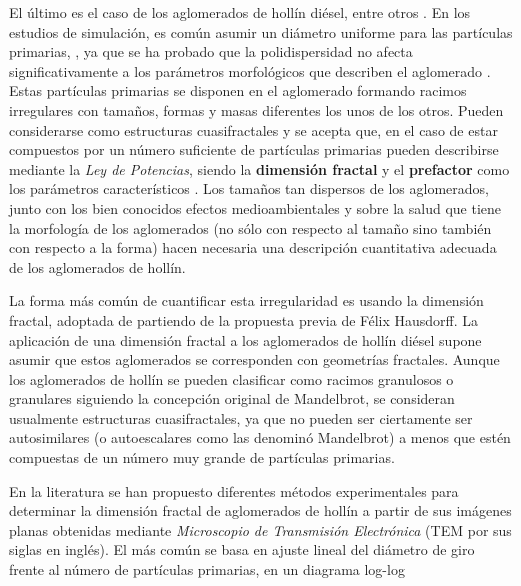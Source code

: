\par El último es el caso de los aglomerados de hollín diésel, entre otros \cite{lapuertaetal:2007}. En los estudios de simulación, es común asumir un diámetro uniforme para las partículas primarias, \cite{wuetal:1993,tandonetal:1995,ohetal:1997,leeetal:2002,zhuetal:2003}, ya que se ha probado que la polidispersidad no afecta significativamente a los parámetros morfológicos que describen el aglomerado \cite{busheletal:1998}. Estas partículas primarias se disponen en el aglomerado formando racimos irregulares con tamaños, formas y masas diferentes los unos de los otros. Pueden considerarse como estructuras cuasifractales y se acepta que, en el caso de estar compuestos por un número suficiente de partículas primarias pueden describirse mediante la \emph{Ley de Potencias}, siendo la \textbf{dimensión fractal} y el \textbf{prefactor} como los parámetros característicos \cite{bonczyketal:1991}. Los tamaños tan dispersos de los aglomerados, junto con los bien conocidos efectos medioambientales y sobre la salud que tiene la morfología de los aglomerados (no sólo con respecto al tamaño sino también con respecto a la forma) \cite{kittleson:1998,meakinetal:1989} hacen necesaria una descripción cuantitativa adecuada de los aglomerados de hollín.

\par La forma más común de cuantificar esta irregularidad es usando la dimensión fractal, adoptada de \cite{mandelbrot:1983} partiendo de la propuesta previa de Félix Hausdorff. La aplicación de una dimensión fractal a los aglomerados de hollín diésel supone asumir que estos aglomerados se corresponden con geometrías fractales. Aunque los aglomerados de hollín se pueden clasificar como racimos granulosos o granulares siguiendo la concepción original de Mandelbrot, se consideran usualmente estructuras cuasifractales, ya que no pueden ser ciertamente ser autosimilares (o autoescalares como las denominó Mandelbrot) a menos que estén compuestas de un número muy grande de partículas primarias.

\par En la literatura se han propuesto diferentes métodos experimentales para determinar la dimensión fractal de aglomerados de hollín a partir de sus imágenes planas obtenidas mediante \textit{Microscopio de Transmisión Electrónica} (TEM por sus siglas en inglés). El más común se basa en ajuste lineal del diámetro de giro frente al número de partículas primarias, en un diagrama log-log \cite{leeetal:2002}

